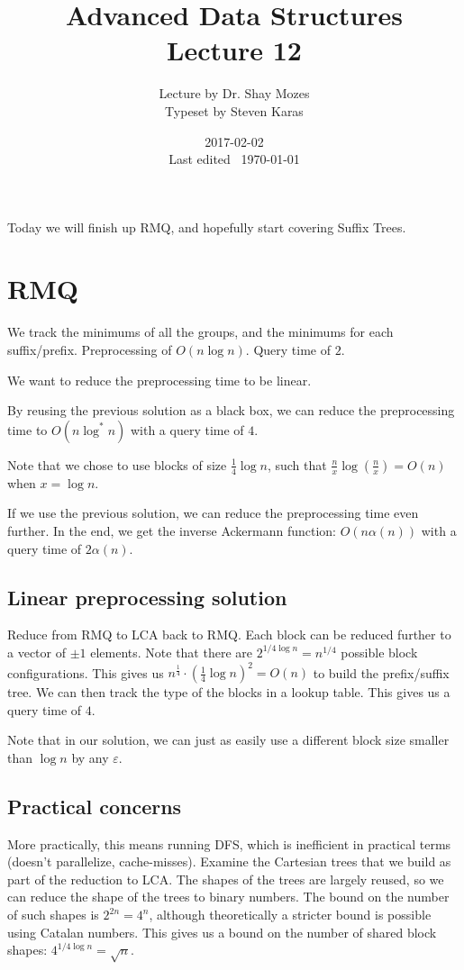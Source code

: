 \documentclass[a4paper]{article}
\title{Advanced Data Structures\\\large Lecture 12}
\date{2017-02-02 \\ Last edited \currenttime\ \today}
\author{Lecture by Dr. Shay Mozes\\Typeset by Steven Karas}
\begin{document}
\maketitle

Today we will finish up RMQ, and hopefully start covering Suffix Trees.

\section{RMQ}

We track the minimums of all the groups, and the minimums for each suffix/prefix.
Preprocessing of $O(n\log n)$.
Query time of $2$.

We want to reduce the preprocessing time to be linear.

By reusing the previous solution as a black box,
we can reduce the preprocessing time to $O(n \log^* n)$ with a query time of $4$.

Note that we chose to use blocks of size $\frac{1}{4}\log n$, such that $\frac{n}{x}\log\left(\frac{n}{x}\right) = O(n)$ when $x=\log n$.

If we use the previous solution, we can reduce the preprocessing time even further.
In the end, we get the inverse Ackermann function: $O(n \alpha(n))$ with a query time of $2\alpha(n)$.

\subsection{Linear preprocessing solution}

Reduce from RMQ to LCA back to RMQ.
Each block can be reduced further to a vector of $\pm1$ elements.
Note that there are $2^{1/4 \log n}=n^{1/4}$ possible block configurations.
This gives us $n^{\frac{1}{4}} \cdot \left(\frac{1}{4}\log n \right)^2=O(n)$ to build the prefix/suffix tree.
We can then track the type of the blocks in a lookup table.
This gives us a query time of $4$.

Note that in our solution, we can just as easily use a different block size smaller than $\log n$ by any $\varepsilon$.

\subsection{Practical concerns}
More practically, this means running DFS, which is inefficient in practical terms (doesn't parallelize, cache-misses).
Examine the Cartesian trees that we build as part of the reduction to LCA.
The shapes of the trees are largely reused, so we can reduce the shape of the trees to binary numbers.
The bound on the number of such shapes is $2^{2n}=4^n$, although theoretically a stricter bound is possible using Catalan numbers.
This gives us a bound on the number of shared block shapes: $4^{1/4 \log n}=\sqrt{n}$.
\end{document}
